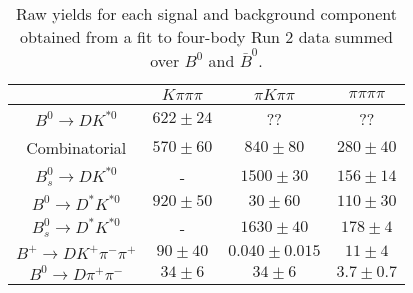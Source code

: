 \begin{table}
  \centering
  \begin{tabular}{cccc}
      \toprule
       & $K\pi\pi\pi$ & $\pi K\pi\pi$ & $\pi\pi\pi\pi$ \\
      \midrule
      $B^0 \to DK^{*0}$ & $622 \pm 24$ & ?? & ?? \\
      Combinatorial & $570 \pm 60$ & $840 \pm 80$ & $280 \pm 40$ \\
      $B^0_s \to DK^{*0}$ & \-- & $1500 \pm 30$ & $156 \pm 14$ \\
      $B^0 \to D^*K^{*0}$ & $920 \pm 50$ & $30 \pm 60$ & $110 \pm 30$ \\
      $B^0_s \to D^*K^{*0}$ & \-- & $1630 \pm 40$ & $178 \pm 4$ \\
      $B^+ \to DK^+\pi^-\pi^+$ & $90 \pm 40$ & $0.040 \pm 0.015$ & $11 \pm 4$ \\
      $B^0 \to D\pi^+\pi^-$ & $34 \pm 6$ & $34 \pm 6$ & $3.7 \pm 0.7$ \\
      \bottomrule
      \end{tabular}
  \caption{Raw yields for each signal and background component obtained from a fit to four-body Run 2 data summed over $B^0$ and $\bar{B}^0$.}
\label{tab:yields_combined_4body_run2}
\end{table}
